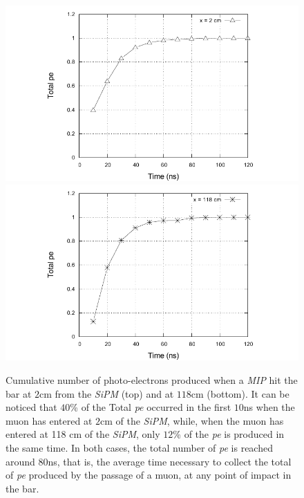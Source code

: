 \documentclass[submitting]{nst}
\begin{document}
\begin{figure}
    \centering
    \includegraphics[scale=0.8]{Figures/cumulativo_1.pdf}
    \includegraphics[scale=0.8]{Figures/cumulativo_2.pdf}
    \caption{Cumulative number of photo-electrons produced when a \textsl{MIP} hit the bar at $2$cm from the  \textsl{SiPM} (top) and at $118$cm (bottom). It can be noticed that $40$\% of the Total \textsl{pe} occurred in the first $10$ns when the muon has entered at $2$cm of the \textsl{SiPM}, while, when the muon has entered at 118 cm of the \textsl{SiPM},   only $12$\% of the \textsl{pe} is produced in the same time. In both cases, the total number of \textsl{pe} is reached around $80$ns, that is, the average time necessary to collect the total of \textsl{pe} produced by the passage of a muon, at any point of impact in the bar.}
    \label{cumulative}
\end{figure}

\end{document}
